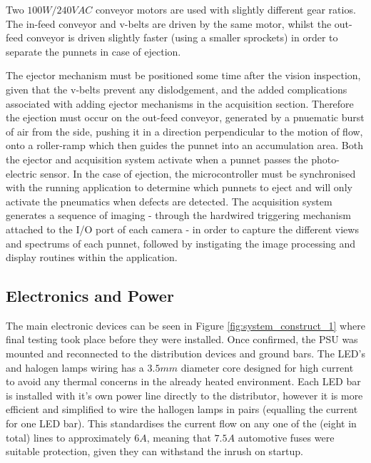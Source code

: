\documentclass[fleqn,twoside,12pt]{report}
\begin{document}
Two $100W/240VAC$ conveyor motors are used with slightly different gear ratios. The in-feed conveyor and v-belts are driven by the same motor, whilst the out-feed conveyor is driven slightly faster (using a smaller sprockets) in order to separate the punnets in case of ejection.


The ejector mechanism must be positioned some time after the vision inspection, given that the v-belts prevent any dislodgement, and the added complications associated with adding ejector mechanisms in the acquisition section. Therefore the ejection must occur on the out-feed conveyor, generated by a pnuematic burst of air from the side, pushing it in a direction perpendicular to the motion of flow, onto a roller-ramp which then guides the punnet into an accumulation area. Both the ejector and acquisition system activate when a punnet passes the photo-electric sensor. In the case of ejection, the microcontroller must be synchronised with the running application to determine which punnets to eject and will only activate the pneumatics when defects are detected. The acquisition system generates a sequence of imaging - through the hardwired triggering mechanism attached to the I/O port of each camera - in order to capture the different views and spectrums of each punnet, followed by instigating the image processing and display routines within the application. 


\subsection{Electronics and Power}


The main electronic devices can be seen in Figure \ref{fig:system_construct_1} where final testing took place before they were installed. Once confirmed, the PSU was mounted and reconnected to the distribution devices and ground bars. The LED's and halogen lamps wiring has a $3.5mm$ diameter core designed for high current to avoid any thermal concerns in the already heated environment. Each LED bar is installed with it's own power line directly to the distributor, however it is more efficient and simplified to wire the hallogen lamps in pairs (equalling the current for one LED bar). This standardises the current flow on any one of the (eight in total) lines to approximately $6A$, meaning that $7.5A$ automotive fuses were suitable protection, given they can withstand the inrush on startup. 
\end{document}
